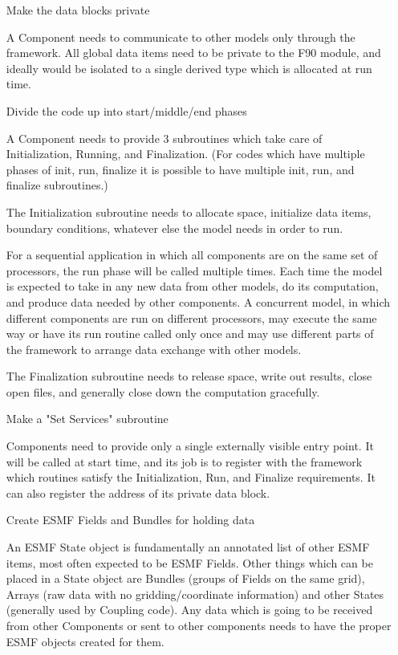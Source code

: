 \begin{enumerate}
\item[Make the data blocks private]

A Component needs to communicate to other models only through the
framework.  All global data items need to be private to the F90 module,
and ideally would be isolated to a single derived type which is allocated
at run time.   

\item[Divide the code up into start/middle/end phases]

A Component needs to provide 3 subroutines which take care of
Initialization, Running, and Finalization.  (For codes which have
multiple phases of init, run, finalize it is possible to have
multiple init, run, and finalize subroutines.)

The Initialization subroutine needs to allocate space, initialize
data items, boundary conditions, whatever else the model needs in
order to run.

For a sequential application in which all components are on the same
set of processors, the run phase will
be called multiple times.  Each time the model is expected to take in
any new data from other models, do its computation, and produce data
needed by other components.   A concurrent model, in which different
components are run on different processors, may execute the same 
way or have its run routine called
only once and may use different parts of the framework to arrange
data exchange with other models.

The Finalization subroutine needs to release space, write out results,
close open files, and generally close down the computation gracefully.

\item[Make a "Set Services" subroutine]

Components need to provide only a single externally visible entry point.
It will be called at start time, and its job is to register with the
framework which routines satisfy the Initialization, Run, and Finalize
requirements.  It can also register the address of its private data block.

\item[Create ESMF Fields and Bundles for holding data]

An ESMF State object is fundamentally an annotated list of other
ESMF items, most often expected to be ESMF Fields.  Other things
which can be placed in a State object are Bundles (groups of Fields
on the same grid), Arrays (raw data with no gridding/coordinate information)
and other States (generally used by Coupling code).  Any data which is
going to be received from other Components or sent to other components
needs to have the proper ESMF objects created for them.


\end{enumerate}
